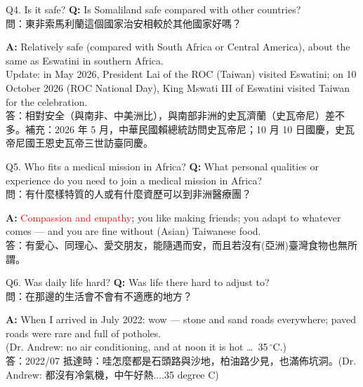 \documentclass[aspectratio=169]{beamer}
\begin{document}
\begin{frame}{Q4. Is it safe?}
\textbf{Q:} Is Somaliland safe compared with other countries? \\
{\footnotesize\color{gray}問：東非索馬利蘭這個國家治安相較於其他國家好嗎？}

\vspace{0.8em}
\textbf{A:} Relatively safe (compared with South Africa or Central America), about the same as Eswatini in southern Africa. \\ Update: in May 2026, President Lai of the ROC (Taiwan) visited Eswatini; on 10 October 2026 (ROC National Day), King Mswati III of Eswatini visited Taiwan for the celebration. \\
{\footnotesize\color{gray}答：相對安全（與南非、中美洲比），與南部非洲的史瓦濟蘭（史瓦帝尼）差不多。補充：2026 年 5 月，中華民國賴總統訪問史瓦帝尼；10 月 10 日國慶，史瓦帝尼國王恩史瓦帝三世訪臺同慶。}
\end{frame}

\begin{frame}{Q5. Who fits a medical mission in Africa?}
\textbf{Q:} What personal qualities or experience do you need to join a medical mission in Africa? \\
{\footnotesize\color{gray}問：有什麼樣特質的人或有什麼資歷可以到非洲醫療團？}

\vspace{0.8em}
\textbf{A:} \textcolor{red}{Compassion and empathy}; you like making friends; you adapt to whatever comes --- and you are fine without (Asian) Taiwanese food. \\
{\footnotesize\color{gray}答：有愛心、同理心、愛交朋友，能隨遇而安，而且若沒有(亞洲)臺灣食物也無所謂。}
\end{frame}

\begin{frame}{Q6. Was daily life hard?}
\textbf{Q:} Was life there hard to adjust to? \\
{\footnotesize\color{gray}問：在那邊的生活會不會有不適應的地方？}

\vspace{0.8em}
\textbf{A:} When I arrived in July 2022: wow --- stone and sand roads everywhere; paved roads were rare and full of potholes. \\ (Dr. Andrew: no air conditioning, and at noon it is hot \ldots\ 35\,$^\circ$C.) \\
{\footnotesize\color{gray}答：2022/07 抵達時：哇怎麼都是石頭路與沙地，柏油路少見，也滿佈坑洞。(Dr. Andrew: 都沒有冷氣機，中午好熱....35 degree C)}
\end{frame}
\end{document}
